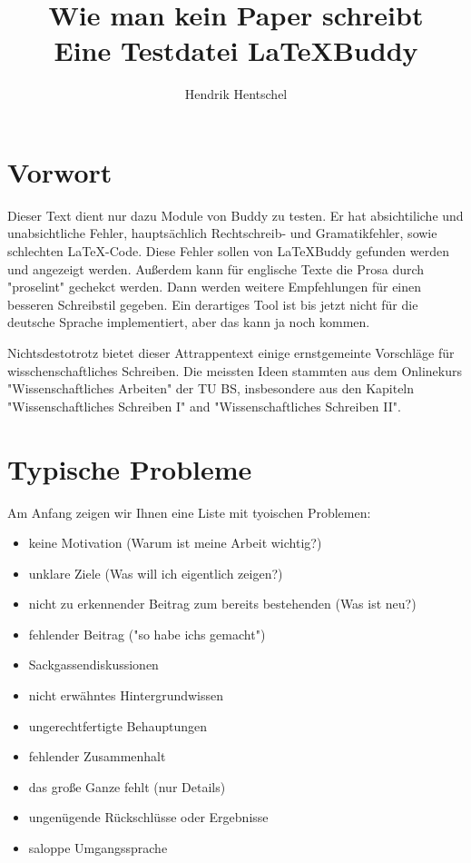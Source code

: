 \documentclass[12pt,a4paper]{article}
\begin{document}
\title{\Large \bf Wie man kein Paper schreibt\\ \Large Eine Testdatei \LaTeX{}Buddy}
\author{Hendrik Hentschel}
\maketitle %
\section*{Vorwort}
Dieser Text dient nur dazu Module von \Latex{}Buddy zu testen. Er hat absichtiliche und unabsichtliche Fehler, hauptsächlich Rechtschreib- und Gramatikfehler, sowie schlechten LaTeX-Code. Diese Fehler sollen von \LaTeX{}Buddy gefunden werden und angezeigt werden. Außerdem kann für englische Texte die Prosa durch "proselint" gechekct werden. Dann werden weitere Empfehlungen für einen besseren Schreibstil gegeben. Ein derartiges Tool ist bis jetzt nicht für die deutsche Sprache implementiert, aber das kann ja noch kommen.

Nichtsdestotrotz bietet dieser Attrappentext einige ernstgemeinte Vorschläge für wisschenschaftliches Schreiben. Die meissten Ideen stammten aus dem Onlinekurs "Wissenschaftliches Arbeiten" der TU BS, insbesondere aus den Kapiteln "Wissenschaftliches Schreiben I" and "Wissenschaftliches Schreiben II".

\section{Typische Probleme}
Am Anfang zeigen wir Ihnen eine Liste mit tyoischen Problemen:
\begin{itemize}
    \item keine Motivation (Warum ist meine Arbeit wichtig?)
    \item unklare Ziele (Was will ich eigentlich zeigen?)
    \item nicht zu erkennender Beitrag zum bereits bestehenden (Was ist neu?)
    \item fehlender Beitrag ("so habe ichs gemacht")
    \item Sackgassendiskussionen
    \item nicht erwähntes Hintergrundwissen
    \item ungerechtfertigte Behauptungen
    \item fehlender Zusammenhalt
    \item das große Ganze fehlt (nur Details)
    \item ungenügende Rückschlüsse oder Ergebnisse
    \item saloppe Umgangssprache
\end{itemize}
\end{document}
